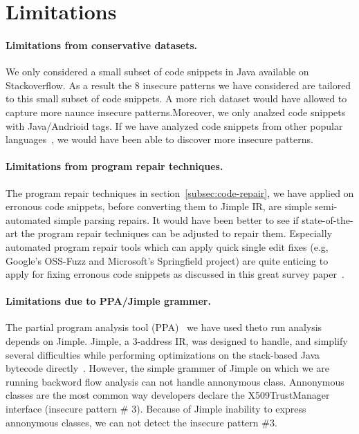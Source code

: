 \section{Limitations}
\label{sec:limitations}
\paragraph{Limitations from conservative datasets.} We only considered a small subset of code snippets in Java available on Stackoverflow. 
As a result the 8 insecure patterns we have considered are tailored to this small subset of code snippets. 
A more rich dataset would have allowed to capture more naunce insecure patterns.Moreover, we only analzed code snippets with Java/Andrioid tags.
If we have analyzed code snippets from other popular languages~\cite{stackoverflow-survey}, we would have been able to
discover more insecure patterns.   


\paragraph{Limitations from program repair techniques.} The program repair techniques in section~\ref{subsec:code-repair}, we have applied on erronous code snippets, 
before converting them to Jimple IR, are simple semi-automated simple parsing  repairs. It would have been better to see if state-of-the-art  
the program repair techniques can be adjusted to repair them. Especially automated program repair tools which can apply quick single edit fixes (e.g, Google's OSS-Fuzz and Microsoft's Springfield project) are quite enticing to apply for fixing erronous code snippets as discussed in this great survey paper~\cite{automated-program-repair}.



\noindent
\label{limitatons:jimple} 
\paragraph{Limitations due to PPA/Jimple grammer.} The partial program analysis tool (PPA)~\cite{dagenais2008enabling} we have used theto run 
analysis depends on Jimple.
Jimple, a 3-address IR, was designed to handle, and simplify several
difficulties while performing optimizations on the stack-based Java bytecode directly~\cite{vallee1998jimple}. However, 
the simple grammer of Jimple on which we are running backword flow analysis can not handle annonymous class. 
Annonymous classes are the most common way developers declare the X509TrustManager interface (insecure pattern \# 3). Because of
Jimple inability to express annonymous classes, we can not detect the insecure pattern \#3.

